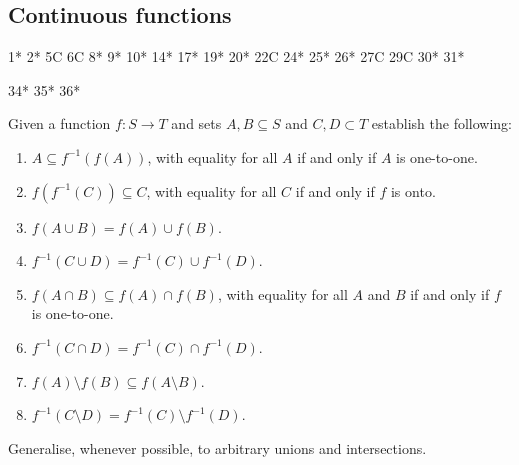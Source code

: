 \subsection{Continuous functions}

1*
2*
5C
6C
8*
9*
10*
14*
17*
19*
20*
22C
24*
25*
26*
27C
29C
30*
31*

34*
35*
36*

\begin{exercise}{1}
Given a function $f:S\to T$ and sets $A,B\subseteq S$ and $C,D\subset T$ establish the following:
\begin{enumerate}
    \item $A \subseteq f^{-1}(f(A))$, with equality for all $A$ if and only if $A$ is one-to-one.
    \item $f(f^{-1}(C))\subseteq C$, with equality for all $C$ if and only if $f$ is onto.
    \item $f(A\cup B)= f(A)\cup f(B)$.
    \item $f^{-1}(C\cup D)=f^{-1}(C)\cup f^{-1}(D)$.
    \item $f(A\cap B)\subseteq f(A)\cap f(B)$, with equality for all $A$ and $B$ if and only if $f$ is one-to-one.
    \item $f^{-1}(C\cap D)=f^{-1}(C)\cap f^{-1}(D)$.
    \item $f(A)\setminus f(B)\subseteq f(A\setminus B)$.
    \item $f^{-1}(C\setminus D)= f^{-1}(C)\setminus f^{-1}(D)$.
\end{enumerate}
Generalise, whenever possible, to arbitrary unions and intersections.
\end{exercise}
